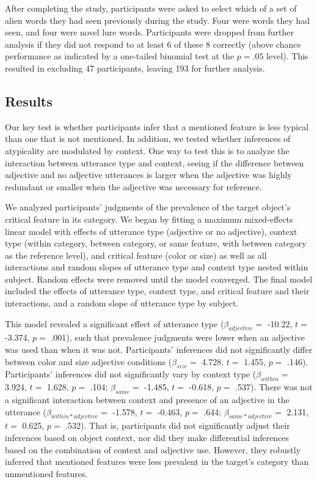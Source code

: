 \documentclass{ucetd}
\begin{document}
After completing the study, participants were asked to select which of a
set of alien words they had seen previously during the study. Four were
words they had seen, and four were novel lure words. Participants were
dropped from further analysis if they did not respond to at least 6 of
these 8 correctly (above chance performance as indicated by a one-tailed
binomial test at the \(p = .05\) level). This resulted in excluding 47
participants, leaving 193 for further analysis.

\hypertarget{results-2}{%
\subsection{Results}\label{results-2}}

Our key test is whether participants infer that a mentioned feature is
less typical than one that is not mentioned. In addition, we tested
whether inferences of atypicality are modulated by context. One way to
test this is to analyze the interaction between utterance type and
context, seeing if the difference between adjective and no adjective
utterances is larger when the adjective was highly redundant or smaller
when the adjective was necessary for reference.

We analyzed participants' judgments of the prevalence of the target
object's critical feature in its category. We began by fitting a maximum
mixed-effects linear model with effects of utterance type (adjective or
no adjective), context type (within category, between category, or same
feature, with between category as the reference level), and critical
feature (color or size) as well as all interactions and random slopes of
utterance type and context type nested within subject. Random effects
were removed until the model converged. The final model included the
effects of utterance type, context type, and critical feature and their
interactions, and a random slope of utterance type by subject.

This model revealed a significant effect of utterance type
(\(\beta_{adjective} =\) -10.22, \(t =\) -3.374, \(p =\) .001), such
that prevalence judgments were lower when an adjective was used than
when it was not. Participants' inferences did not significantly differ
between color and size adjective conditions (\(\beta_{size} =\) 4.728,
\(t =\) 1.455, \(p =\) .146). Participants' inferences did not
significantly vary by context type (\(\beta_{within} =\) 3.924, \(t =\)
1.628, \(p =\) .104; \(\beta_{same} =\) -1.485, \(t =\) -0.618, \(p =\)
.537). There was not a significant interaction between context and
presence of an adjective in the utterance
(\(\beta_{within*adjective} =\) -1.578, \(t =\) -0.463, \(p =\) .644;
\(\beta_{same*adjective} =\) 2.131, \(t =\) 0.625, \(p =\) .532). That
is, participants did not significantly adjust their inferences based on
object context, nor did they make differential inferences based on the
combination of context and adjective use. However, they robustly
inferred that mentioned features were less prevalent in the target's
category than unmentioned features.
\end{document}
